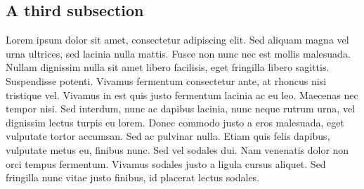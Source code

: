 \documentclass[letterpaper,11pt,leqno]{article}
\begin{document}
\subsection{A third subsection}

Lorem ipsum dolor sit amet, consectetur adipiscing elit. Sed aliquam magna vel urna ultrices, sed lacinia nulla mattis. Fusce non nunc nec est mollis malesuada. Nullam dignissim nulla sit amet libero facilisis, eget fringilla libero sagittis. Suspendisse potenti. Vivamus fermentum consectetur ante, at rhoncus nisi tristique vel. Vivamus in est quis justo fermentum lacinia ac eu leo. Maecenas nec tempor nisi. Sed interdum, nunc ac dapibus lacinia, nunc neque rutrum urna, vel dignissim lectus turpis eu lorem. Donec commodo justo a eros malesuada, eget vulputate tortor accumsan. Sed ac pulvinar nulla. Etiam quis felis dapibus, vulputate metus eu, finibus nunc. Sed vel sodales dui. Nam venenatis dolor non orci tempus fermentum. Vivamus sodales justo a ligula cursus aliquet. Sed fringilla nunc vitae justo finibus, id placerat lectus sodales.
\end{document}
